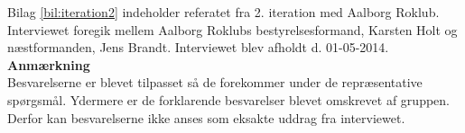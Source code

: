 \label{bil:iteration2}


Bilag \ref{bil:iteration2} indeholder referatet fra 2. iteration med Aalborg Roklub. Interviewet foregik mellem Aalborg Roklubs bestyrelsesformand, Karsten Holt og næstformanden, Jens Brandt. Interviewet blev afholdt d. 01-05-2014.\\

{\bf Anmærkning} \\
Besvarelserne er blevet tilpasset så de forekommer under de repræsentative spørgsmål. Ydermere er de forklarende besvarelser blevet omskrevet af gruppen. Derfor kan besvarelserne ikke anses som eksakte uddrag fra interviewet. 